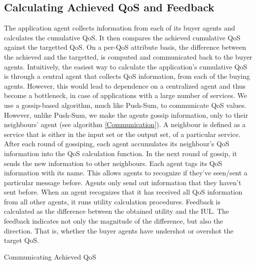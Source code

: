 \documentclass[10pt,journal,compsoc]{IEEEtran}
\begin{document}
\subsection{Calculating Achieved QoS and Feedback}
 The application agent collects information from each of its buyer agents and calculates the cumulative QoS. It then compares the achieved cumulative QoS against the targetted QoS. On a per-QoS attribute basis, the difference between the achieved and the targetted, is computed and communicated back to the buyer agents.  Intuitively, the easiest way to calculate the application's cumulative QoS is through a central agent that collects QoS information, from each of the buying agents. However, this would lead to dependence on a centralized agent and thus become a bottleneck, in case of applications with a large number of services. We use a gossip-based algorithm, much like Push-Sum\cite{Kempe2003Gossip-Based}, to communicate QoS values. However, unlike Push-Sum, we make the agents gossip information, only to their neighbours' agent (see algorithm \ref{Communication}). A neighbour is defined as a service that is either in the input set or the output set, of a particular service. After each round of gossiping, each agent accumulates its neighbour's QoS information into the QoS calculation function. In the next round of gossip, it sends the new information to other neighbours. Each agent tags its QoS information with its name. This allows agents to recognize if they've seen/sent a particular message before. Agents only send out information that they haven't sent before. When an agent recognizes that it has received all QoS information from all other agents, it runs utility calculation procedures. Feedback is calculated as the difference between the obtained utility and the IUL. The feedback indicates not only the magnitude of the difference, but also the direction. That is, whether the buyer agents have undershot or overshot the target QoS.   
	
\begin{algorithm}
 \caption{Communicating Achieved QoS}
 \label{Communication}
\end{algorithm}
\end{document}
